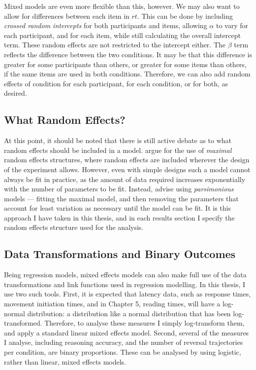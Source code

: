 Mixed models are even more flexible than this, however.
We may also want to allow for differences between each item in $rt$.
This can be done by including \emph{crossed random intercepts} \citep{Baayen2008}
for both participants and items,
allowing $\alpha$ to vary for each participant, and for each item,
while still calculating the overall intercept term.
These random effects are not restricted to the intercept either.
The $\beta$ term reflects the difference between the two conditions.
It may be that this difference is greater for some participants than others,
or greater for some items than others, if the same items are used in both conditions.
Therefore, we can also add random effects of condition for each participant,
for each condition, or for both, as desired.

\subsection{What Random Effects?}\label{subsec:statistics-random}

At this point, it should be noted that there is still active debate
as to what random effects should be included in a model.
\citet{Barr2013} argue for the use of \emph{maximal} random effects structures,
where random effects are included wherever the design of the experiment allows.
However, even with simple designs such a model cannot always be fit in practice,
as the amount of data required increases exponentially with the number of parameters to be fit.
Instead, \citet{Bates2015} advise using \emph{parsimonious} models ---
fitting the maximal model, and then removing the parameters
that account for least variation as necessary until the model can be fit.
It is this approach I have taken in this thesis,
and in each results section I specify the random effects structure used for the analysis.


\subsection{Data Transformations and Binary Outcomes}\label{subsec:statistics-tranform}

Being regression models, mixed effects models
can also make full use of the data transformations
and link functions used in regression modelling.
In this thesis, I use two such tools.
First, it is expected that latency data,
such as response times, movement initiation times,
and in Chapter 5, reading times,
will have a log-normal distribution:
a distribution like a normal distribution
that has been log-transformed.
Therefore, to analyse these measures I simply log-transform them,
and apply a standard linear mixed effects model.
Second, several of the measures I analyse,
including reasoning accuracy,
and the number of reversal trajectories per condition, are binary proportions.
These can be analysed by using logistic, rather than linear, mixed effects models.

